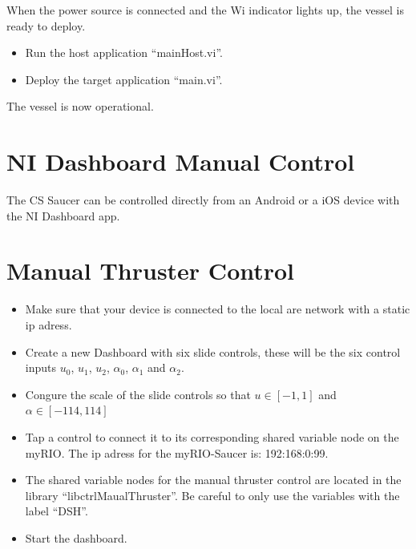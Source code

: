 \documentclass[a4paper,twoside,english]{report}
\begin{document}
When the power source is connected and the Wi indicator lights up,
the vessel is ready to deploy.
\begin{itemize}
\item Run the host application ``mainHost.vi''.
\item Deploy the target application ``main.vi''.
\end{itemize}
The vessel is now operational.

\section{NI Dashboard Manual Control}

The CS Saucer can be controlled directly from an Android or a iOS
device with the NI Dashboard app.

\section{Manual Thruster Control}
\begin{itemize}
\item Make sure that your device is connected to the local are network with
a static ip adress.
\item Create a new Dashboard with six slide controls, these will be the
six control inputs $u_{0}$, $u_{1}$, $u_{2}$, $\alpha_{0}$, $\alpha_{1}$
and $\alpha_{2}$.
\item Congure the scale of the slide controls so that $u\in\left[-1,1\right]$
and $\alpha\in\left[-114,114\right]$
\item Tap a control to connect it to its corresponding shared variable node
on the myRIO. The ip adress for the myRIO-Saucer is: 192:168:0:99.
\item The shared variable nodes for the manual thruster control are located
in the library ``libctrlMaualThruster''. Be careful to only use
the variables with the label ``DSH''.
\item Start the dashboard.
\end{itemize}
\end{document}
